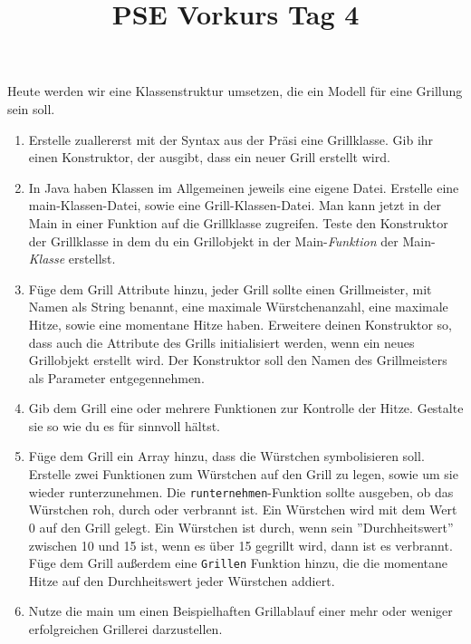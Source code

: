 \documentclass{../../sheet}
\title{PSE Vorkurs Tag 4}
\begin{document}
\maketitle

\newpage

Heute werden wir eine Klassenstruktur umsetzen, die ein Modell für eine Grillung sein soll.

\begin{enumerate}
    \item Erstelle zuallererst mit der Syntax aus der Präsi eine Grillklasse. Gib ihr einen Konstruktor, der ausgibt, dass ein neuer Grill erstellt wird. 
    \item In Java haben Klassen im Allgemeinen jeweils eine eigene Datei. Erstelle eine main-Klassen-Datei, sowie eine Grill-Klassen-Datei. Man kann jetzt in der Main in einer Funktion auf die Grillklasse zugreifen. Teste den Konstruktor der Grillklasse in dem du ein Grillobjekt in der Main-\textit{Funktion} der Main-\textit{Klasse} erstellst.
    \item Füge dem Grill Attribute hinzu, jeder Grill sollte einen Grillmeister, mit Namen als String benannt, eine maximale Würstchenanzahl, eine maximale Hitze, sowie eine momentane Hitze haben. Erweitere deinen Konstruktor so, dass auch die Attribute des Grills initialisiert werden, wenn ein neues Grillobjekt erstellt wird. Der Konstruktor soll den Namen des Grillmeisters als Parameter entgegennehmen.
    \item Gib dem Grill eine oder mehrere Funktionen zur Kontrolle der Hitze. Gestalte sie so wie du es für sinnvoll hältst.
    \item Füge dem Grill ein Array hinzu, dass die Würstchen symbolisieren soll. Erstelle zwei Funktionen zum Würstchen auf den Grill zu legen, sowie um sie wieder runterzunehmen. Die \texttt{runternehmen}-Funktion sollte ausgeben, ob das Würstchen roh, durch oder verbrannt ist. Ein Würstchen wird mit dem Wert 0 auf den Grill gelegt. Ein Würstchen ist durch, wenn sein ''Durchheitswert'' zwischen 10 und 15 ist, wenn es über 15 gegrillt wird, dann ist es verbrannt. \\
    Füge dem Grill außerdem eine \texttt{Grillen} Funktion hinzu, die die momentane Hitze auf den Durchheitswert jeder Würstchen addiert.
    \item Nutze die main um einen Beispielhaften Grillablauf einer mehr oder weniger erfolgreichen Grillerei darzustellen. 
\end{enumerate}
\end{document}
